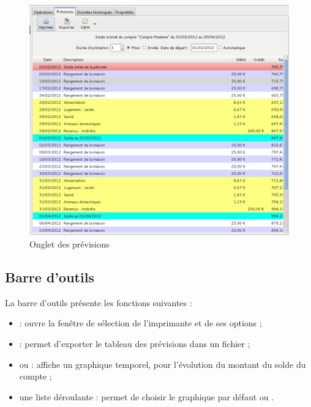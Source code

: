 \ifIllustration
\begin{figure}[t]
\begin{center}
\includegraphics[scale=0.49]{image/screenshot/budget_estimate}
\end{center}
\caption{Onglet des prévisions}
\label{budget-estimate-img}
\end{figure}
\fi

\ifIllustration
\else
\newpage
\fi

\subsection{Barre d'outils\label{budget-estimate-functions}}

La barre d'outils présente les fonctions suivantes  : 
\begin{itemize}
	 \item {} : ouvre la fenêtre de sélection de l'imprimante et de ses options ;
	 \item {} : permet d'exporter le tableau des prévisions dans un fichier ;
	 \item {} ou  : affiche un graphique temporel, pour l'évolution du montant du solde du compte ;
	 \item une liste déroulante : permet de choisir le graphique par défaut  ou .	 
\end{itemize}


